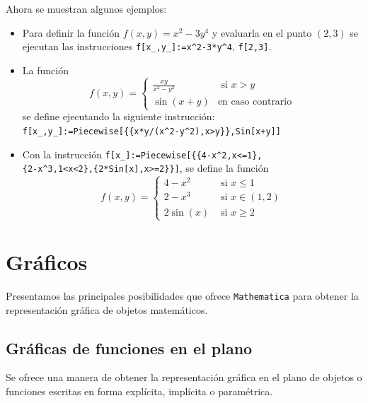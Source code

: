     Ahora se muestran algunos ejemplos:
    \begin{itemize}
      \item Para definir la función $f(x,y)=x^2-3y^4$ y evaluarla en el punto $(2,3)$ se ejecutan
        las instrucciones \verb"f[x_,y_]:=x^2-3*y^4", \verb"f[2,3]".
      \item La función
        $$ f(x,y) = \left \{
          \begin{array}{cl} \frac{xy}{x^2-y^2} & \text{ si } x>y \\[0.2cm] \sin(x+y) & \text{en caso contrario}
          \end{array} \right.$$
          se define ejecutando la siguiente instrucción:\\
          \verb"f[x_,y_]:=Piecewise[{{x*y/(x^2-y^2),x>y}},Sin[x+y]]"
        \item Con la instrucción \verb"f[x_]:=Piecewise[{{4-x^2,x<=1}," \\
          \verb"{2-x^3,1<x<2},{2*Sin[x],x>=2}}]", se define la función
          $$ f(x,y) = \left \{
            \begin{array}{cl} 4-x^2 & \text{ si } x\leq 1 \\[0.2cm]
              2-x^3 & \text{ si } x\in(1,2)\\[0.2cm]
              2 \sin(x) & \text{ si } x\geq 2
            \end{array} \right.$$
        \end{itemize}

        \section{Gráficos}
        Presentamos las principales posibilidades que ofrece \verb"Mathematica"
        para obtener la representación gráfica de objetos matemáticos.

        \subsection{Gráficas de funciones en el plano}
        Se ofrece una manera de obtener la representación gráfica en el plano de objetos o funciones
        escritas en forma explícita, implícita o paramétrica.

